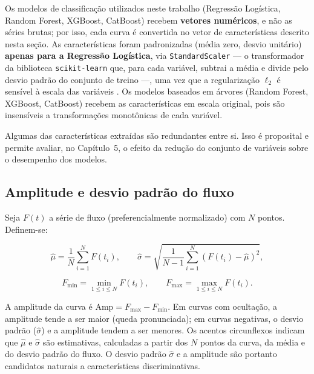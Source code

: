 Os modelos de classificação utilizados neste trabalho (Regressão Logística, Random Forest, XGBoost, CatBoost) recebem \textbf{vetores numéricos}, e não as séries brutas; por isso, cada curva é convertida no vetor de características descrito nesta seção. As características foram padronizadas (média zero, desvio unitário) \textbf{apenas para a Regressão Logística}, via \texttt{StandardScaler} --- o transformador da biblioteca \texttt{scikit-learn} \citep{ScikitLearn2011} que, para cada variável, subtrai a média e divide pelo desvio padrão do conjunto de treino ---, uma vez que a regularização $\ell_2$ é sensível à escala das variáveis \citep{geron2019maos}. Os modelos baseados em árvores (Random Forest, XGBoost, CatBoost) recebem as características em escala original, pois são insensíveis a transformações monotônicas de cada variável.

Algumas das características extraídas são redundantes entre si. Isso é proposital e permite avaliar, no Capítulo~5, o efeito da redução do conjunto de variáveis sobre o desempenho dos modelos.

\subsection{Amplitude e desvio padrão do fluxo}

Seja \(F(t)\) a série de fluxo (preferencialmente normalizado) com \(N\) pontos. Definem-se:

\begin{equation}
\hat{\mu} = \frac{1}{N} \sum_{i=1}^{N} F(t_i), \qquad
\hat{\sigma} = \sqrt{\frac{1}{N - 1} \sum_{i=1}^{N} \left( F(t_i) - \hat{\mu} \right)^2},
\end{equation}

\begin{equation}
F_{\min} = \min_{1 \leq i \leq N} F(t_i), \qquad
F_{\max} = \max_{1 \leq i \leq N} F(t_i).
\end{equation}

A amplitude da curva é \(\mathrm{Amp} = F_{\max} - F_{\min}\). Em curvas com ocultação, a amplitude tende a ser maior (queda pronunciada); em curvas negativas, o desvio padrão (\(\hat{\sigma}\)) e a amplitude tendem a ser menores. Os acentos circunflexos indicam que \(\hat{\mu}\) e \(\hat{\sigma}\) são estimativas, calculadas a partir dos \(N\) pontos da curva, da média e do desvio padrão do fluxo. O desvio padrão \(\hat{\sigma}\) e a amplitude são portanto candidatos naturais a características discriminativas.


